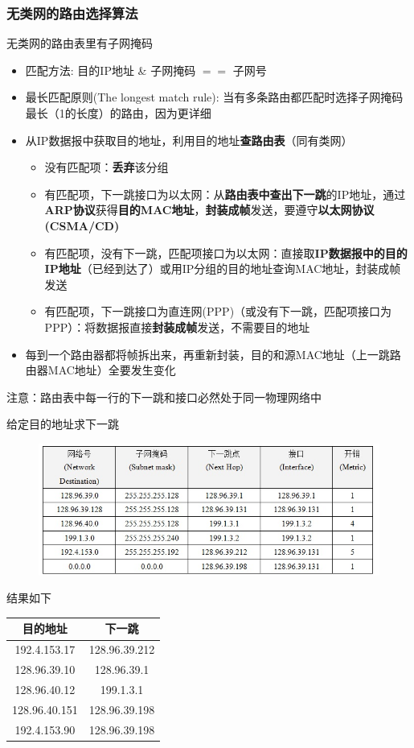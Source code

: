 \subsubsection{无类网的路由选择算法}
无类网的路由表里有子网掩码
\begin{itemize}
	\item 匹配方法: 目的IP地址 \& 子网掩码 $==$ 子网号
	\item 最长匹配原则(The longest match rule): 当有多条路由都匹配时选择子网掩码最长（1的长度）的路由，因为更详细
	\item 从IP数据报中获取目的地址，利用目的地址\textbf{查路由表}（同有类网）
	\begin{itemize}
		\item 没有匹配项：\textbf{丢弃}该分组
		\item 有匹配项，下一跳接口为以太网：从\textbf{路由表中查出下一跳}的IP地址，通过\textbf{ARP协议}获得\textbf{目的MAC地址}，\textbf{封装成帧}发送，要遵守\textbf{以太网协议(CSMA/CD)}
		\item 有匹配项，没有下一跳，匹配项接口为以太网：直接取\textbf{IP数据报中的目的IP地址}（已经到达了）或用IP分组的目的地址查询MAC地址，封装成帧发送
		\item 有匹配项，下一跳接口为直连网(PPP)（或没有下一跳，匹配项接口为PPP）：将数据报直接\textbf{封装成帧}发送，不需要目的地址
	\end{itemize}
	\item 每到一个路由器都将帧拆出来，再重新封装，目的和源MAC地址（上一跳路由器MAC地址）全要发生变化
\end{itemize}
注意：路由表中每一行的下一跳和接口必然处于同一物理网络中

\begin{example}
	给定目的地址求下一跳
\begin{figure}[H]
	\centering
	\includegraphics[width=0.8\linewidth]{fig/router_table_example.jpg}
\end{figure}
\end{example}
\begin{analysis}
	结果如下
	\begin{center}
		\begin{tabular}{cc}\hline
			目的地址 & 下一跳\\\hline
			192.4.153.17 & 128.96.39.212\\
			128.96.39.10 & 128.96.39.1\\
			128.96.40.12 & 199.1.3.1\\
			128.96.40.151 & 128.96.39.198\\
			192.4.153.90 & 128.96.39.198\\\hline
		\end{tabular}
	\end{center}
\end{analysis}

